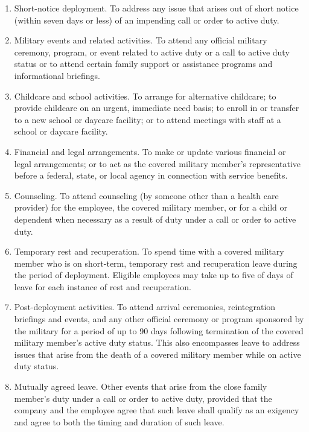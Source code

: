 \begin{enumerate} 	\item Short-notice deployment. To address any 	issue that arises out of short notice (within seven 	days or less) of an impending call or order to 	active duty.
	
	\item Military events and related activities. To 	attend any official military ceremony, program, 	or event related to active duty or a call to active 	duty status or to attend certain family support or 	assistance programs and informational briefings.
	
	\item Childcare and school activities. To arrange 	for alternative childcare; to provide childcare on 	an urgent, immediate need basis; to enroll in or 	transfer to a new school or daycare facility; or to 	attend meetings with staff at a school or daycare 	facility.
	
	\item Financial and legal arrangements. To make 	or update various financial or legal 	arrangements; or to act as the covered military 	member's representative before a federal, state, 	or local agency in connection with service 	benefits.
	
	\item Counseling. To attend counseling (by 	someone other than a health care provider) for 	the employee, the covered military member, or 	for a child or dependent when necessary as a 	result of duty under a call or order to active duty.
	
	\item Temporary rest and recuperation. To spend 	time with a covered military member who is on 	short-term, temporary rest and recuperation 	leave during the period of deployment. Eligible 	employees may take up to five of days of leave 	for each instance of rest and recuperation.
	
	\item Post-deployment activities. To attend arrival 	ceremonies, reintegration briefings and events, 	and any other official ceremony or program 	sponsored by the military for a period of up to 90 	days following termination of the covered military 	member’s active duty status. This also 	encompasses leave to address issues that arise 	from the death of a covered military member 	while on active duty status.
	
	\item Mutually agreed leave. Other events that arise 	from the close family member’s duty under a call 	or order to active duty, provided that the 	company and the employee agree that such 	leave shall qualify as an exigency and agree to 	both the timing and duration of such leave. \end{enumerate}

